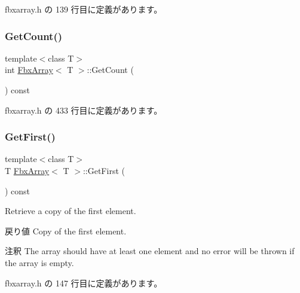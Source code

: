  fbxarray.\+h の 139 行目に定義があります。

\mbox{\label{class_fbx_array_a7a47b85464e00634fb9fce26409c7d2a}} 
\subsubsection{\texorpdfstring{Get\+Count()}{GetCount()}}
{\footnotesize\ttfamily template$<$class T$>$ \\
int \hyperlink{class_fbx_array}{Fbx\+Array}$<$ T $>$\+::Get\+Count (\begin{DoxyParamCaption}{ }\end{DoxyParamCaption}) const\hspace{0.3cm}{\ttfamily [inline]}}



 fbxarray.\+h の 433 行目に定義があります。

\mbox{\label{class_fbx_array_a913fc7ea982235d344c572f47367b96c}} 
\subsubsection{\texorpdfstring{Get\+First()}{GetFirst()}}
{\footnotesize\ttfamily template$<$class T$>$ \\
T \hyperlink{class_fbx_array}{Fbx\+Array}$<$ T $>$\+::Get\+First (\begin{DoxyParamCaption}{ }\end{DoxyParamCaption}) const\hspace{0.3cm}{\ttfamily [inline]}}

Retrieve a copy of the first element. \begin{DoxyReturn}{戻り値}
Copy of the first element. 
\end{DoxyReturn}
\begin{DoxyRemark}{注釈}
The array should have at least one element and no error will be thrown if the array is empty. 
\end{DoxyRemark}


 fbxarray.\+h の 147 行目に定義があります。

\mbox{\label{class_fbx_array_a25a185391ce395e3d409ceef08200f14}} 
